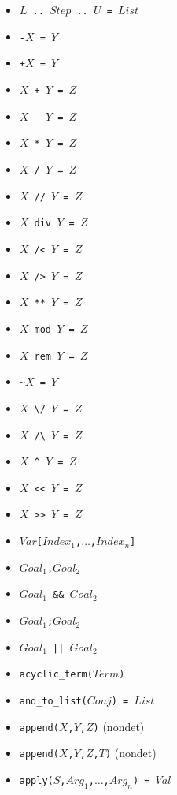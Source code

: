 \documentclass[10pt]{article}
\begin{document}
\begin{multicols}{2}
\begin{scriptsize}
\begin{itemize}
    \item {\tt $L$ \verb+..+ $Step$ \verb+..+ $U$ = $List$} 
    \item {\tt \verb+-+$X$ = $Y$}
    \item {\tt \verb-+-$X$ = $Y$}
    \item {\tt $X$ \verb-+- $Y$ = $Z$} 
    \item {\tt $X$ \verb+-+ $Y$ = $Z$} 
    \item {\tt $X$ \verb+*+ $Y$ = $Z$} 
    \item {\tt $X$ \verb+/+ $Y$ = $Z$} 
    \item {\tt $X$ \verb+//+ $Y$ = $Z$} 
    \item \texttt{$X$ div $Y$ = $Z$} 
    \item {\tt $X$ \verb+/<+ $Y$ = $Z$} 
    \item {\tt $X$ \verb+/>+ $Y$ = $Z$} 
    \item {\tt $X$ \verb+**+ $Y$ = $Z$} 
    \item \texttt{$X$ mod $Y$ = $Z$} 
    \item \texttt{$X$ rem $Y$ = $Z$} 
    \item {\tt \verb+~+$X$ = $Y$} 
    \item {\tt $X$ \verb+\/+ $Y$ = $Z$} 
    \item {\tt $X$ \verb+/\+ $Y$ = $Z$} 
    \item {\tt $X$ \verb+^+ $Y$ = $Z$} 
    \item {\tt $X$ \verb+<<+ $Y$ = $Z$} 
    \item {\tt $X$ \verb+>>+ $Y$ = $Z$} 
    \item {\tt $Var$\verb+[+$Index_1$,$\ldots$,$Index_n$\verb+]+}
    \item \texttt{$Goal_1$,$Goal_2$}
    \item \texttt{$Goal_1$ \&\& $Goal_2$}
    \item \texttt{$Goal_1$;$Goal_2$}
    \item \texttt{$Goal_1$ || $Goal_2$}
    \item \texttt{acyclic\_term($Term$)}
    \item \texttt{and\_to\_list($Conj$) = $List$}
    \item \texttt{append($X$,$Y$,$Z$)}  (nondet)
    \item \texttt{append($X$,$Y$,$Z$,$T$)}  (nondet)
    \item \texttt{apply($S$,$Arg_1$,$\ldots$,$Arg_n$) = $Val$} 

\end{itemize}
\end{scriptsize}
\end{multicols}
\end{document}
